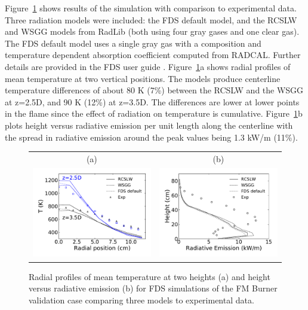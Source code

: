 \documentclass[preprint,12pt]{elsarticle}
\begin{document}
    Figure~\ref{f:fds} shows results of the simulation with comparison to experimental data. Three radiation models were included: the FDS default model, and the RCSLW and WSGG models from RadLib (both using four gray gases and one clear gas).
    The FDS default model uses a single gray gas with a composition and temperature dependent absorption coefficient computed from RADCAL. Further details are provided in the FDS user guide \cite{FDS}.
    Figure~\ref{f:fds}a shows radial profiles of mean temperature at two vertical positions. The models produce centerline temperature differences of about 80 K (7\%) between the RCSLW and the WSGG at z=2.5D, and 90 K (12\%) at z=3.5D. The differences are lower at lower points in the flame since the effect of radiation on temperature is cumulative. Figure~\ref{f:fds}b plots height versus radiative emission per unit length along the centerline with the spread in radiative emission around the peak values being 1.3 kW/m (11\%).
%
    \begin{figure}
        \begin{center}
            \begin{tabular}{c c}
            (a)
                & (b) \\
                \includegraphics[width=2.5 in]{fig_fds_T_mean.pdf} &
                \includegraphics[width=2.5 in]{fig_fds_rad_mean.pdf}
            \end{tabular}
            \caption{Radial profiles of mean temperature at two heights (a) and height versus radiative emission (b) for FDS simulations of the FM Burner validation case comparing three models to experimental data.}
            \label{f:fds}
        \end{center}
    \end{figure}
%
\end{document}
